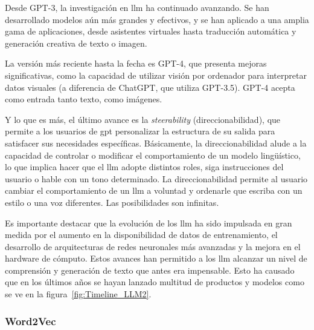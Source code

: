 \begin{itemize}
Desde GPT-3, la investigación en \acrshort{llm} ha continuado avanzando. Se han desarrollado modelos aún más grandes y efectivos, y se han aplicado a una amplia gama de aplicaciones, desde asistentes virtuales hasta traducción automática y generación creativa de texto o imagen.

La versión más reciente hasta la fecha es GPT-4, que presenta mejoras significativas, como la capacidad de utilizar visión por ordenador para interpretar datos visuales (a diferencia de ChatGPT, que utiliza GPT-3.5). GPT-4 acepta como entrada tanto texto, como imágenes. 

Y lo que es más, el último avance es la \textit{steerability} (direccionabilidad), que permite a los usuarios de \acrshort{gpt} personalizar la estructura de su salida para satisfacer sus necesidades específicas. Básicamente, la direccionabilidad alude a la capacidad de controlar o modificar el comportamiento de un modelo lingüístico, lo que implica hacer que el \acrshort{llm} adopte distintos roles, siga instrucciones del usuario o hable con un tono determinado. La direccionabilidad permite al usuario cambiar el comportamiento de un \acrshort{llm} a voluntad y ordenarle que escriba con un estilo o una voz diferentes. Las posibilidades son infinitas.

\end{itemize}


Es importante destacar que la evolución de los \acrshort{llm} ha sido impulsada en gran medida por el aumento en la disponibilidad de datos de entrenamiento, el desarrollo de arquitecturas de redes neuronales más avanzadas y la mejora en el hardware de cómputo. Estos avances han permitido a los \acrshort{llm} alcanzar un nivel de comprensión y generación de texto que antes era impensable. Esto ha causado que en los últimos años se hayan lanzado multitud de productos y modelos como se ve en la figura~\ref{fig:Timeline_LLM2}.

\subsubsection{Word2Vec}

